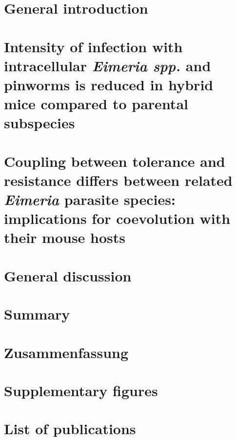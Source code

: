 \documentclass[11pt]{report}
\numberwithin{equation}{section} %
\begin{document}
\chapter{General introduction}

 
\chapter{Intensity of infection with intracellular \textit{Eimeria spp.} and pinworms is reduced in hybrid mice compared to parental subspecies}


\chapter{Coupling between tolerance and resistance differs between related \textit{Eimeria} parasite species: implications for coevolution with their mouse hosts}


\chapter{General discussion}


\chapter*{Summary}


\chapter*{Zusammenfassung}


\newpage
\printbibliography[heading=bibintoc]

\chapter*{Supplementary figures}


\chapter*{List of publications}

\end{document}

